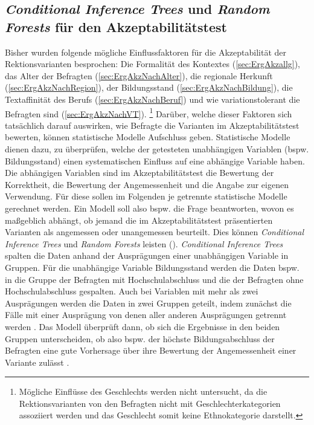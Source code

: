 \subsection{\textit{Conditional Inference Trees} und \textit{Random Forests} für den Akzeptabilitätstest}
\label{sec:ErgAkzCTrees}
Bisher wurden folgende mögliche Einflussfaktoren für die Akzeptabilität der Rektionsvarianten besprochen: 
Die Formalität des Kontextes (\autoref{sec:ErgAkzallg}), das Alter der Befragten (\autoref{sec:ErgAkzNachAlter}), die regionale Herkunft (\autoref{sec:ErgAkzNachRegion}), der Bildungsstand (\autoref{sec:ErgAkzNachBildung}), die Textaffinität des Berufs (\autoref{sec:ErgAkzNachBeruf}) und wie variationstolerant die Befragten sind (\autoref{sec:ErgAkzNachVT}).%
\footnote{Mögliche Einflüsse des Geschlechts werden nicht untersucht, da die Rektionsvarianten von den Befragten nicht mit Geschlechterkategorien assoziiert werden und das Geschlecht somit keine Ethnokategorie darstellt.} 
Darüber, welche dieser Faktoren sich tatsächlich darauf auswirken, wie Befragte die Varianten im Akzeptabilitätstest bewerten, können statistische Modelle Aufschluss geben. 
Statistische Modelle dienen dazu, zu überprüfen, welche der getesteten unabhängigen Variablen (bspw. Bildungsstand) einen systematischen Einfluss auf eine abhängige Variable haben. 
Die abhängigen Variablen sind im Akzeptabilitätstest die Bewertung der Korrektheit, die Bewertung der Angemessenheit und die Angabe zur eigenen Verwendung. 
Für diese sollen im Folgenden je getrennte statistische Modelle gerechnet werden. 
Ein Modell soll also bspw. die Frage beantworten, wovon es maßgeblich abhängt, ob jemand die im Akzeptabilitätstest präsentierten Varianten als angemessen oder unangemessen beurteilt. 
Dies können \textit{Conditional Inference Trees} und \textit{Random Forests} leisten (\cites[s.][]{Tagliamonte.2012}[291]{Levshina.2015}). 
\textit{Conditional Inference Trees} spalten die Daten anhand der Ausprägungen einer unabhängigen Variable in Gruppen. 
Für die unabhängige Variable \glqq Bildungsstand\grqq{} werden die Daten bspw. in die Gruppe der Befragten mit Hochschulabschluss und die der Befragten ohne Hochschulabschluss gespalten. 
Auch bei Variablen mit mehr als zwei Ausprägungen werden die Daten in zwei Gruppen geteilt, indem zunächst die Fälle mit einer Ausprägung von denen aller anderen Ausprägungen getrennt werden \citep[s.][291]{Levshina.2015}. 
Das Modell überprüft dann, ob sich die Ergebnisse in den beiden Gruppen unterscheiden, ob also bspw. der höchste Bildungsabschluss der Befragten eine gute Vorhersage über ihre Bewertung der Angemessenheit einer Variante zulässt \citep[s.][159]{Tagliamonte.2012}. 
